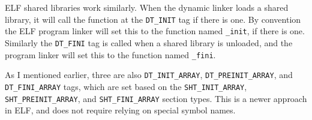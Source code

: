 ELF shared libraries work similarly. When the dynamic linker loads a shared
library, it will call the function at the \texttt{DT\_INIT} tag if there is
one. By convention the ELF program linker will set this to the function named
\texttt{\_init}, if there is one. Similarly the \texttt{DT\_FINI} tag is called
when a shared library is unloaded, and the program linker will set this to the
function named \texttt{\_fini}.

As I mentioned earlier, three are also \texttt{DT\_INIT\_ARRAY},
\texttt{DT\_PREINIT\_ARRAY}, and \texttt{DT\_FINI\_ARRAY} tags, which are set
based on the \texttt{SHT\_INIT\_ARRAY}, \texttt{SHT\_PREINIT\_ARRAY}, and
\texttt{SHT\_FINI\_ARRAY} section types. This is a newer approach in ELF, and
does not require relying on special symbol names.
